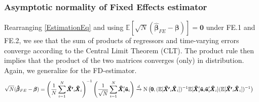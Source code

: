 \subsubsection*{Asymptotic normality of Fixed Effects estimator}
Rearranging \eqref{EstimationEq} and using $\mathbb{E}[\sqrt{N}(\pmb{\hat{\beta}}_{FE}-\pmb{\beta})]=\pmb{0}$ under FE.1 and FE.2, we see that the sum of products of regressors and time-varying errors converge according to the Central Limit Theorem (CLT). The product rule then implies that the product of the two matrices converges (only) in distribution. Again, we generalize for the FD-estimator. 
\begin{align} 
    \sqrt{N}(\pmb{\hat{\beta}}_{FE}-\pmb{\beta}) &=  \left( \frac{1}{N} \sum_{i=1}^N {\pmb{\ddot{X'}}_{i} \pmb{\ddot{X}}_{i} } \right) ^{-1} \left( \frac{1}{\sqrt{N}} \sum_{i=1}^N {\pmb{\ddot{X}}_i' \pmb{\ddot{u}}_i} \right) \notag
    \xrightarrow{d} \text{N} \left(\pmb{0},
(\mathbb{E}[\pmb{\ddot{X'}}_{i} \pmb{\ddot{X}}_{i}])^{-1} \mathbb{E}[\pmb{\ddot{X}}_i' \pmb{\ddot{u}}_i\pmb{\ddot{u}}_i'\pmb{\ddot{X}}_i] (\mathbb{E}[\pmb{\ddot{X'}}_{i} \pmb{\ddot{X}}_{i}])^{-1} \right)
\end{align}



